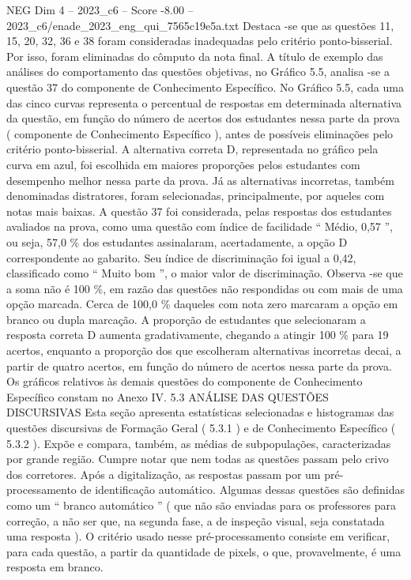 \begin{textsample}{NEG Dim 4 – 2023\_c6 – Score -8.00 – 2023\_c6/enade\_2023\_eng\_qui\_7565c19e5a.txt}
Destaca -se que as questões 11, 15, 20, 32, 36 e 38 foram consideradas inadequadas pelo critério ponto-bisserial.
Por isso, foram eliminadas do cômputo da nota final.
A título de exemplo das análises do comportamento das questões objetivas, no Gráfico 5.5, analisa -se a questão 37 do componente de Conhecimento Específico.
No Gráfico 5.5, cada uma das cinco curvas representa o percentual de respostas em determinada alternativa da questão, em função do número de acertos dos estudantes nessa parte da prova ( componente de Conhecimento Específico ), antes de possíveis eliminações pelo critério ponto-bisserial.
A alternativa correta D, representada no gráfico pela curva em azul, foi escolhida em maiores proporções pelos estudantes com desempenho melhor nessa parte da prova.
Já as alternativas incorretas, também denominadas distratores, foram selecionadas, principalmente, por aqueles com notas mais baixas.
A questão 37 foi considerada, pelas respostas dos estudantes avaliados na prova, como uma questão com índice de facilidade “ Médio, 0,57 ”, ou seja, 57,0 \% dos estudantes assinalaram, acertadamente, a opção D correspondente ao gabarito.
Seu índice de discriminação foi igual a 0,42, classificado como “ Muito bom ”, o maior valor de discriminação.
Observa -se que a soma não é 100 \%, em razão das questões não respondidas ou com mais de uma opção marcada.
Cerca de 100,0 \% daqueles com nota zero marcaram a opção em branco ou dupla marcação.
A proporção de estudantes que selecionaram a resposta correta D aumenta gradativamente, chegando a atingir 100 \% para 19 acertos, enquanto a proporção dos que escolheram alternativas incorretas decai, a partir de quatro acertos, em função do número de acertos nessa parte da prova.
Os gráficos relativos às demais questões do componente de Conhecimento Específico constam no Anexo IV. 5.3 ANÁLISE DAS QUESTÕES DISCURSIVAS Esta seção apresenta estatísticas selecionadas e histogramas das questões discursivas de Formação Geral ( 5.3.1 ) e de Conhecimento Específico ( 5.3.2 ).
Expõe e compara, também, as médias de subpopulações, caracterizadas por grande região.
Cumpre notar que nem todas as questões passam pelo crivo dos corretores.
Após a digitalização, as respostas passam por um pré-processamento de identificação automático.
Algumas dessas questões são definidas como um “ branco automático ” ( que não são enviadas para os professores para correção, a não ser que, na segunda fase, a de inspeção visual, seja constatada uma resposta ).
O critério usado nesse pré-processamento consiste em verificar, para cada questão, a partir da quantidade de pixels, o que, provavelmente, é uma resposta em branco.

\end{textsample}

